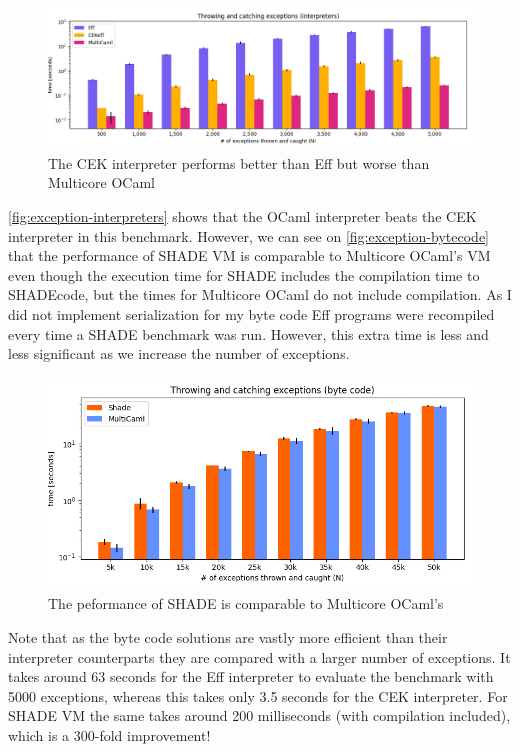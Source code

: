 \documentclass[class=article, crop=false]{standalone}
\begin{document}
\begin{figure}[htb]
    \centering
    \includegraphics[width=.9\linewidth]{eval_plots/interp_exception.png}
    \caption[Exception benchmark with interpreters]{The CEK interpreter performs better than Eff but worse than
    Multicore OCaml}
    \label{fig:exception-interpreters}
\end{figure}

\autoref{fig:exception-interpreters} shows that the OCaml interpreter beats
the CEK interpreter in this benchmark. However, we can see on
\autoref{fig:exception-bytecode} that the performance of SHADE VM is
comparable to Multicore OCaml's VM even though the
execution time for SHADE includes the compilation time to SHADEcode,
but the times for Multicore OCaml do not include compilation. As I did not
implement serialization for my byte code Eff programs were recompiled every time
a SHADE benchmark was run. However, this extra time is less and less significant
as we increase the number of exceptions.

\begin{figure}[htb]
    \centering
    \includegraphics[width=.8\linewidth]{eval_plots/comp_exception.png}
    \caption[Exception benchmark with compilers]{The peformance of SHADE is comparable to Multicore OCaml's}
    \label{fig:exception-bytecode}
\end{figure}

Note that as the byte code solutions are vastly more efficient than their
interpreter counterparts they are compared with a larger number of exceptions.
It takes around 63 seconds for the Eff interpreter to evaluate the benchmark
with 5000 exceptions, whereas this takes only 3.5 seconds for the CEK
interpreter. For SHADE VM the same takes around 200 milliseconds
(with compilation included), which is a 300-fold improvement!
\end{document}
